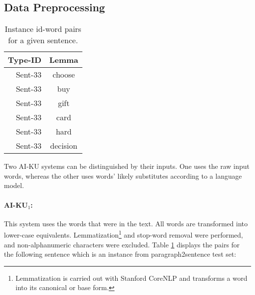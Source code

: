 \documentclass[11pt]{article}
\begin{document}
\subsection{Data Preprocessing}

\begin{table}
\begin{center}
\begin{tabular}{|r|c|}
\hline \bf Type-ID & \bf Lemma \\ \hline
Sent-33 & choose \\
Sent-33 & buy \\
Sent-33 & gift \\
Sent-33 & card \\
Sent-33 & hard \\
Sent-33 & decision \\
\hline
\end{tabular}
\end{center}
\caption{\label{tab:system1_input} Instance id-word pairs for a given sentence.}
\end{table}


\begin{table*}[htbp]
\caption{Contexts and substitute distributions when a bigram language model is used. $w$ and $n$ denote an arbitrary word in the vocabulary and the vocabulary size, respectively.}
\label{tab:subs_exp}
\end{table*}
Two AI-KU systems can be distinguished by their inputs. One uses the raw input words, whereas the other uses words' likely substitutes according to a language model.

\paragraph{AI-KU$_1$:} This system uses the words that were in the text. All words are transformed into lower-case equivalents. Lemmatization\footnote{Lemmatization is carried out with Stanford CoreNLP and transforms a word into its canonical or base form.} and stop-word removal were performed, and non-alphanumeric characters were excluded. 
Table \ref{tab:system1_input} displays the pairs for the following sentence which is an instance from paragraph2sentence test set:
\end{document}
